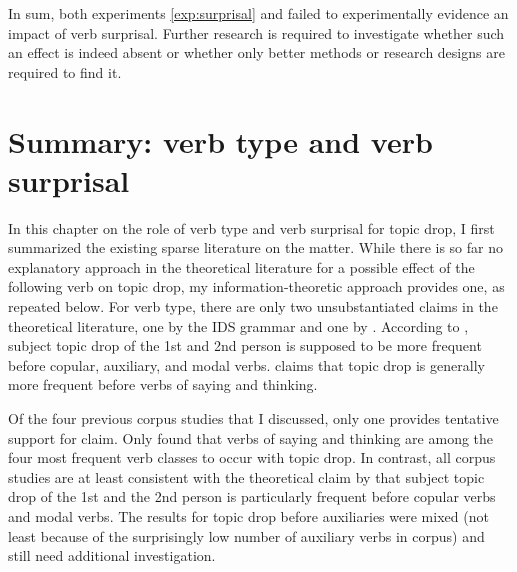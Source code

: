 In sum, both experiments \ref*{exp:surprisal} and  failed to experimentally evidence an impact of verb surprisal.
Further research is required to investigate whether such an effect is indeed absent or whether only better methods or research designs are required to find it.  

\section{Summary: verb type and verb surprisal}
\largerpage
In this chapter on the role of verb type and verb surprisal for topic drop, I first summarized the existing sparse literature on the matter.
While there is so far no explanatory approach in the theoretical literature for a possible effect of the following verb on topic drop, my information-theoretic approach provides one, as repeated below.
For verb type, there are only two unsubstantiated claims in the theoretical literature, one by the IDS grammar \citep{zifonun.etal1997} and one by \citet{imo2013}.
According to \citet{zifonun.etal1997}, subject topic drop of the 1st and 2nd person is supposed to be more frequent before copular, auxiliary, and modal verbs.
\citet{imo2013} claims that topic drop is generally more frequent before verbs of saying and thinking.

Of the four previous corpus  studies that I discussed, only one provides tentative support for  claim.
Only \citet{helmer2016} found that verbs of saying and thinking are among the four most frequent verb classes to occur with topic drop.
In contrast, all corpus studies are at least consistent with the theoretical claim by \citet{zifonun.etal1997} that subject topic drop of the 1st and the 2nd person is particularly frequent before copular verbs and modal verbs.
The results for topic drop before auxiliaries were mixed (not least because of the surprisingly low number of auxiliary verbs in  corpus) and still need additional investigation. 

